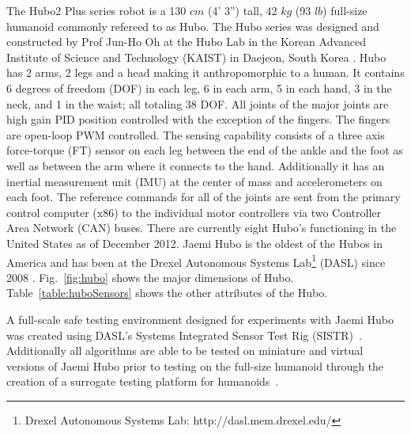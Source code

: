 The Hubo2 Plus series robot is a 130 $cm$ (4' 3'') tall, 42 $kg$ (93 $lb$) full-size humanoid commonly refereed to as Hubo.  
The Hubo series was designed and constructed by Prof Jun-Ho Oh at the Hubo Lab in the Korean Advanced Institute of Science and Technology (KAIST) in Daejeon, South Korea \cite{1573587}.
Hubo has 2 arms, 2 legs and a head making it anthropomorphic to a human.
It contains 6 degrees of freedom (DOF) in each leg, 6 in each arm, 5 in each hand, 3 in the neck, and 1 in the waist; all totaling 38 DOF.
All joints of the major joints are high gain PID position controlled with the exception of the fingers.
The fingers are open-loop PWM controlled.
The sensing capability consists of a three axis force-torque (FT) sensor on each leg between the end of the ankle and the foot as well as between the arm where it connects to the hand.
Additionally it has an inertial measurement unit (IMU) at the center of mass and accelerometers on each foot.
The reference commands for all of the joints are sent from the primary control computer (x86) to the individual motor controllers via two Controller Area Network (CAN) buses.
There are currently eight Hubo's functioning in the United States as of December 2012.
Jaemi Hubo is the oldest of the Hubos in America and has been at the Drexel Autonomous Systems Lab\footnote{Drexel Autonomous Systems Lab: http://dasl.mem.drexel.edu/} (DASL) since 2008 \cite{jaemiHuboSRM}.
Fig.~\ref{fig:hubo} shows the major dimensions of Hubo.
Table~\ref{table:huboSensors} shows the other attributes of the Hubo.

A full-scale safe testing environment designed for experiments with Jaemi Hubo was created using DASL's Systems Integrated Sensor Test Rig (SISTR)~\cite{5686325}.  
Additionally all algorithms are able to be tested on miniature and virtual versions of Jaemi Hubo prior to testing on the full-size humanoid through the creation of a surrogate testing platform for humanoids~\cite{5379582}.

